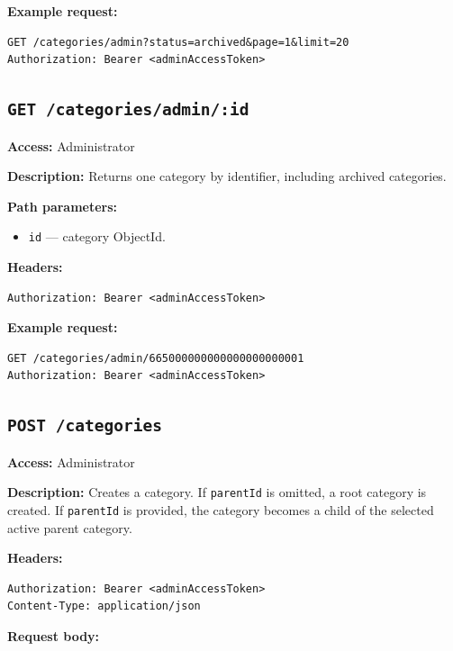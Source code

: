 \textbf{Example request:}

\begin{verbatim}
GET /categories/admin?status=archived&page=1&limit=20
Authorization: Bearer <adminAccessToken>
\end{verbatim}

\subsection{\texttt{GET /categories/admin/:id}}

\textbf{Access:} Administrator

\textbf{Description:} Returns one category by identifier, including archived categories.

\textbf{Path parameters:}

\begin{itemize}
    \item \texttt{id} --- category ObjectId.
\end{itemize}

\textbf{Headers:}

\begin{verbatim}
Authorization: Bearer <adminAccessToken>
\end{verbatim}

\textbf{Example request:}

\begin{verbatim}
GET /categories/admin/665000000000000000000001
Authorization: Bearer <adminAccessToken>
\end{verbatim}

\subsection{\texttt{POST /categories}}

\textbf{Access:} Administrator

\textbf{Description:} Creates a category. If \texttt{parentId} is omitted, a root category is created. If \texttt{parentId} is provided, the category becomes a child of the selected active parent category.

\textbf{Headers:}

\begin{verbatim}
Authorization: Bearer <adminAccessToken>
Content-Type: application/json
\end{verbatim}

\textbf{Request body:}

